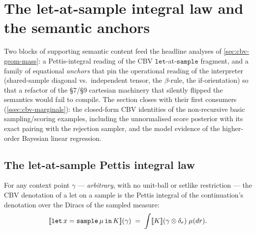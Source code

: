 \section{The let-at-sample integral law and the semantic anchors}%
\label{sec:cbv-laws}

Two blocks of supporting semantic content feed the headline analyses
of \autoref{sec:cbv-geom-mass}: a Pettis-integral reading of the CBV
$\mathtt{let}$-at-$\mathtt{sample}$ fragment, and a family of
equational \emph{anchors} that pin the operational reading of the
interpreter (shared-sample diagonal vs.\ independent tensor, the
$\beta$-rule, the if-orientation) so that a refactor of the \S7/\S9
cartesian machinery that silently flipped the semantics would fail to
compile. The section closes with their first consumers
(\autoref{ssec:cbv-marginals}): the closed-form CBV identities of the
non-recursive basic sampling/scoring examples, including the
unnormalised score posterior with its exact pairing with the
rejection sampler, and the model evidence of the higher-order
Bayesian linear regression.

\subsection{The let-at-sample Pettis integral law}%
\label{ssec:cbv-let-sample}

\begin{theorem}%
\label{thm:cbv-let-sample}
\rocqok
{}\rocqok
{}\rocqok
{}\rocqok
{}
For any context point $\gamma$ --- \emph{arbitrary}, with no unit-ball
or setlike restriction --- the CBV denotation of a let on a sample is
the Pettis integral of the continuation's denotation over the Diracs
of the sampled measure:
\[
  [\![ \mathtt{let}\,x = \mathtt{sample}\,\mu\,\mathtt{in}\,K ]\!](\gamma)
  \;=\;
  \int [\![ K ]\!](\gamma \otimes \delta_r)\;\mu(dr).
\]
\end{theorem}

